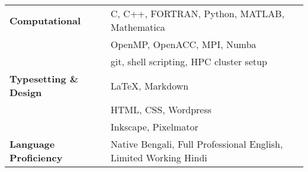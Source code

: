 \begin{longtable}[l]{@{} m{5cm} m{12cm}}
\textbf{Computational} & C, C++, FORTRAN, Python, MATLAB, Mathematica\\
                                  & OpenMP, OpenACC, MPI, Numba\\
                                  & git, shell scripting, HPC cluster setup\\[0.2cm]

\textbf{Typesetting \& Design} & \LaTeX, Markdown \\
                                                          & HTML, CSS, Wordpress \\
                                                          & Inkscape, Pixelmator\\[0.2cm]
                                                            
\textbf{Language Proficiency} & Native Bengali, Full Professional English,  Limited Working Hindi\\                                               
\end{longtable}